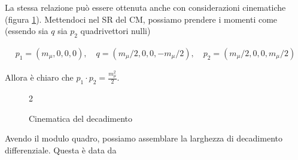 \documentclass[11pt]{report}
\begin{document}
La stessa relazione può essere ottenuta anche con considerazioni cinematiche (figura \ref{fig:muongammadecay}). Mettendoci nel SR del CM, possiamo prendere i momenti come (essendo sia \(q\) sia \(p_2\) quadrivettori nulli)

\begin{align}
    p_1 = (m_\mu, 0, 0, 0), \quad q = (m_\mu/2, 0, 0, -m_\mu/2), \quad p_2 = (m_\mu/2, 0, 0, m_\mu/2)
\end{align}

Allora è chiaro che \(p_1\cdot p_2 = \frac{m_\mu^2}{2}\). 

\begin{figure}
    \caption{Cinematica del decadimento}
    \label{fig:muongammadecay}
    \begin{multicols}{2}
    \begin{center}
    \end{center}

    \columnbreak

    \begin{center}
    \end{center}
    
\end{multicols}
\end{figure}

Avendo il modulo quadro, possiamo assemblare la larghezza di decadimento differenziale. Questa è data da 
\end{document}
